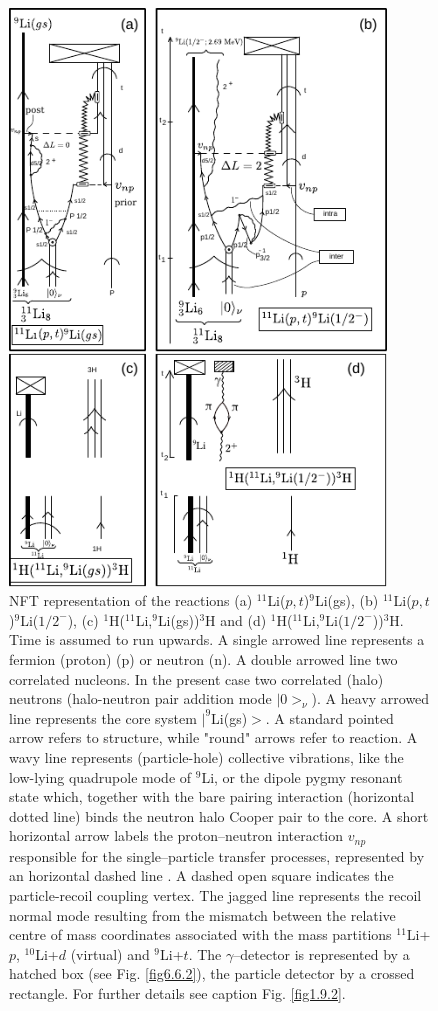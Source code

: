           \begin{figure}
          \centerline {
          \includegraphics*[width=10cm]{introduccion/figs/fig1_9_3xxx}
          }
          \caption{NFT representation  of the reactions (a) $^{11}$Li($p,t$)$^9$Li(gs), (b) $^{11}$Li($p,t$)$^9$Li($1/2^-$), (c)  $^{1}$H($^{11}$Li,$^9$Li(gs))$^3$H and (d) $^{1}$H($^{11}$Li,$^9$Li($1/2^-$))$^3$H. Time is assumed to run upwards.
              	A single arrowed line represents a fermion (proton) (p) or neutron (n). A double arrowed line  two correlated nucleons. In the present case two correlated (halo) neutrons (halo-neutron pair addition mode $|0>_{\nu}$). A heavy arrowed line represents  the core system $|^9$Li(gs)$>$. A standard 
              	pointed arrow refers to structure, while "round" arrows refer to reaction. A wavy line represents (particle-hole) collective vibrations,
              	 like the low-lying quadrupole mode of $^9$Li, or the  dipole pygmy resonant state  which, together  with the bare pairing interaction (horizontal dotted line) binds the neutron  halo Cooper pair to the core.  A short horizontal arrow labels the proton--neutron interaction $v_{np}$ responsible for  the single--particle transfer  processes, represented by an horizontal dashed line .
              	 A dashed open square  indicates the particle-recoil coupling vertex.
              	   The jagged line  represents the recoil normal mode resulting from the mismatch between the relative centre of mass coordinates  associated with  the mass partitions $^{11}$Li+$p$, $^{10}$Li+$d$ (virtual) and  $^9$Li+$t$. 
              	 The $\gamma$--detector is represented by a hatched box (see Fig. \ref{fig6.6.2}), the  particle detector  by a crossed rectangle. For further details see caption Fig. \ref{fig1.9.2}.}
          \label{fig1.9.3}
          \end{figure}
